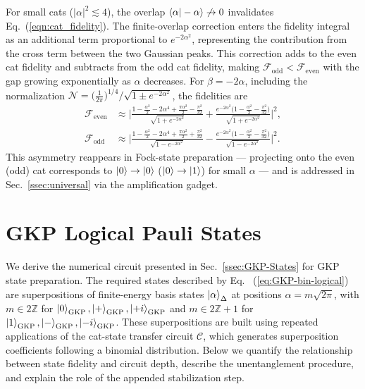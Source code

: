 \documentclass[aps,prx,showpacs,notitlepage,twocolumn,superscriptaddress,nofootinbib,preprintnumbers,floatfix,10pt, longbibliography]{revtex4-2}
\begin{document}
{For small cats ($|\alpha|^2\lesssim 4$), the overlap 
$\braket{\alpha|-\alpha}\not\to 0$ invalidates 
Eq.~(\ref{eqn:cat_fidelity}). The finite-overlap correction enters the 
fidelity integral as an additional term proportional to 
$e^{-2\alpha^2}$, representing the contribution from the cross term 
between the two Gaussian peaks. This correction adds to the even cat 
fidelity and subtracts from the odd cat fidelity, making 
$\mathcal{F}_\mathrm{odd}<\mathcal{F}_\mathrm{even}$ with the gap growing 
exponentially as $\alpha$ decreases. For $\beta=-2\alpha$, including the 
normalization $\mathcal{N}=\bigl(\frac{1}{2\pi}\bigr)^{1/4}/
\sqrt{1\pm e^{-2\alpha^2}}$, the fidelities are
\begin{align}
\mathcal{F}_\mathrm{even}
  &\approx\Biggl|
    \frac{1-\frac{\alpha^2}{2}-2\alpha^4+\frac{\pi\alpha^2}{2}
          -\frac{\pi^2}{32}}{\sqrt{1+e^{-2\alpha^2}}}
   +\frac{e^{-2\alpha^2}\bigl(1-\frac{\alpha^2}{2}
          -\frac{\pi^2}{32}\bigr)}{\sqrt{1+e^{-2\alpha^2}}}
  \Biggr|^2,\label{Fidelity_small_even}\\
\mathcal{F}_\mathrm{odd}
  &\approx\Biggl|
    \frac{1-\frac{\alpha^2}{2}-2\alpha^4+\frac{\pi\alpha^2}{2}
          +\frac{\pi^2}{32}}{\sqrt{1-e^{-2\alpha^2}}}
   -\frac{e^{-2\alpha^2}\bigl(1-\frac{\alpha^2}{2}
          -\frac{\pi^2}{32}\bigr)}{\sqrt{1-e^{-2\alpha^2}}}
  \Biggr|^2.\label{Fidelity_small_odd}
\end{align}
This asymmetry reappears in Fock-state preparation — projecting onto the 
even (odd) cat corresponds to $\ket{0}\to\ket{0}$ ($\ket{0}\to\ket{1}$) 
for small $\alpha$ — and is addressed in Sec.~\ref{ssec:universal} via 
the amplification gadget.
\section{GKP Logical Pauli States}\label{app:GKP-prep}

We derive the numerical circuit presented in Sec.~\ref{ssec:GKP-States}
for GKP state preparation. The required states described by Eq.~
(\ref{eq:GKP-bin-logical}) are superpositions of
finite-energy basis states $\ket{\alpha}_\Delta$ at positions
$\alpha=m\sqrt{2\pi}$, with $m\in 2\mathbb{Z}$ for
$\ket{0}_\mathrm{GKP},\ket{+}_\mathrm{GKP},\ket{+i}_\mathrm{GKP}$ and
$m\in 2\mathbb{Z}+1$ for
$\ket{1}_\mathrm{GKP},\ket{-}_\mathrm{GKP},\ket{-i}_\mathrm{GKP}$.
These superpositions are built using repeated applications of the cat-state
transfer circuit $\mathcal{C}$, which generates superposition coefficients
following a binomial distribution.  Below we quantify the relationship
between state fidelity and circuit depth, describe the unentanglement
procedure, and explain the role of the appended stabilization step.

}
\end{document}
